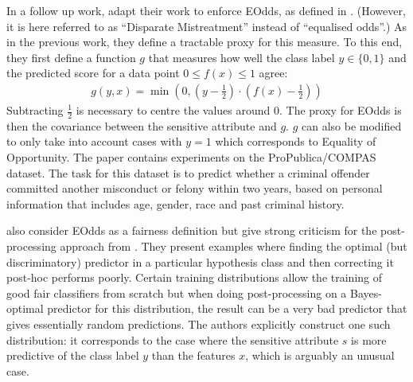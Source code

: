 In a follow up work, \citet{zafar2017fairnesstreatment} adapt their work to enforce \acf{EOdds},
as defined in \citet{hardt2016equality}.
(However, it is here referred to as ``Disparate Mistreatment'' instead of ``equalised odds''.)
As in the previous work, they define a tractable proxy for this measure.
To this end, they first define a function \(g\) that measures
how well the class label \(y \in \{0, 1\}\) and the predicted score for a data point \(0 \leq f(x) \leq 1\) agree:
\begin{align}
  \label{eq:zafar-constraint-2}
  g(y, x) = \min \left(0, \left(y - \tfrac{1}{2}\right) \cdot \left(f(x) - \tfrac{1}{2}\right)\right)
\end{align}
Subtracting \(\tfrac{1}{2}\) is necessary to centre the values around \(0\).
The proxy for \ac{EOdds} is then the covariance between the sensitive attribute and \(g\).
\(g\) can also be modified to only take into account cases with \(y=1\) which corresponds to Equality of Opportunity.
The paper contains experiments on the ProPublica/COMPAS dataset.
The task for this dataset is to predict
whether a criminal offender committed another misconduct or felony within two years,
based on personal information that includes age, gender, race and past criminal history.

\citet{woodworth2017learning} also consider \ac{EOdds} as a fairness definition
but give strong criticism for the post-processing approach from \citet{hardt2016equality}.
They present examples where finding the optimal (but discriminatory) predictor in a particular hypothesis class
and then correcting it post-hoc performs poorly.
Certain training distributions allow the training of good fair classifiers from scratch
but when doing post-processing on a Bayes-optimal predictor for this distribution,
the result can be a very bad predictor that gives essentially random predictions.
The authors explicitly construct one such distribution:
it corresponds to the case where the sensitive attribute \(s\) is more predictive of the class label \(y\)
than the features \(x\), which is arguably an unusual case.

